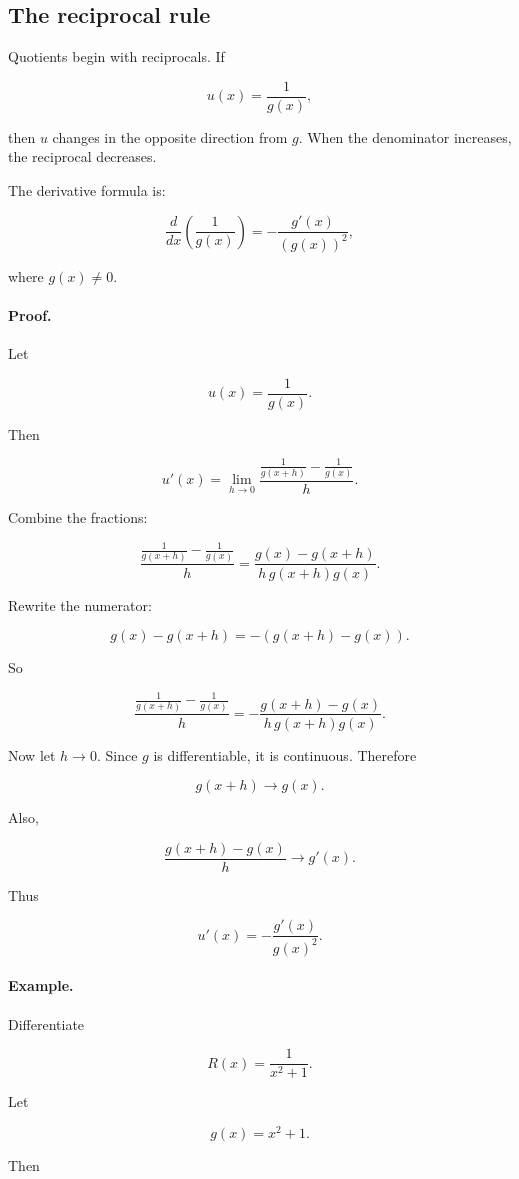 \subsection{The reciprocal rule}
\label{subsec:reciprocal-rule}

Quotients begin with reciprocals.  If

\[
u(x)=\frac1{g(x)},
\]

then \(u\) changes in the opposite direction from \(g\).  When the denominator increases, the reciprocal decreases.

The derivative formula is:

\[
\boxed{
\frac{d}{dx}\left(\frac1{g(x)}\right)
=
-\frac{g'(x)}{(g(x))^2},
}
\]

where \(g(x)\neq0\).

\paragraph{Proof.}
Let

\[
u(x)=\frac1{g(x)}.
\]

Then

\[
u'(x)
=
\lim_{h\to0}
\frac{\frac1{g(x+h)}-\frac1{g(x)}}{h}.
\]

Combine the fractions:

\[
\frac{\frac1{g(x+h)}-\frac1{g(x)}}{h}
=
\frac{g(x)-g(x+h)}{h\,g(x+h)g(x)}.
\]

Rewrite the numerator:

\[
g(x)-g(x+h)=-(g(x+h)-g(x)).
\]

So

\[
\frac{\frac1{g(x+h)}-\frac1{g(x)}}{h}
=
-\frac{g(x+h)-g(x)}{h\,g(x+h)g(x)}.
\]

Now let \(h\to0\).  Since \(g\) is differentiable, it is continuous.  Therefore

\[
g(x+h)\to g(x).
\]

Also,

\[
\frac{g(x+h)-g(x)}{h}\to g'(x).
\]

Thus

\[
u'(x)
=
-\frac{g'(x)}{g(x)^2}.
\]

\paragraph{Example.}
Differentiate

\[
R(x)=\frac1{x^2+1}.
\]

Let

\[
g(x)=x^2+1.
\]

Then

